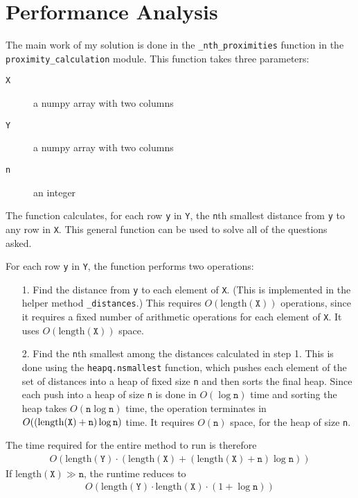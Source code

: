 \documentclass{amsart}
\theoremstyle{definition}
\theoremstyle{definition}
\begin{document}
\section{Performance Analysis}
The main work of my solution is done in the \texttt{\_nth\_proximities} function in the \texttt{proximity\_calculation} module.  This function takes three parameters:
\begin{description}
\item[\texttt{X}] a numpy array with two columns
\item[\texttt{Y}] a numpy array with two columns
\item[\texttt{n}] an integer
\end{description}
The function calculates, for each row \texttt{y} in \texttt{Y}, the \texttt{n}th smallest distance from \texttt{y} to any row in \texttt{X}.  This general function can be used to solve all of the questions asked.

For each row \texttt{y} in \texttt{Y}, the function performs two operations:
\begin{itemize}
\item[1.] Find the distance from \texttt{y} to each element of \texttt{X}.  (This is implemented in the helper method \texttt{\_distances}.)  This requires $O(\mbox{length}(\texttt{X}))$ operations, since it requires a fixed number of arithmetic operations for each element of \texttt{X}.  It uses $O(\mbox{length}(\texttt{X}))$ space.
\item[2.] Find the \texttt{n}th smallest among the distances calculated in step 1.  This is done using the \texttt{heapq.nsmallest} function, which pushes each element of the set of distances into a heap of fixed size \texttt{n} and then sorts the final heap.  Since each push into a heap of size \texttt{n} is done in $O(\log \texttt{n})$ time and sorting the heap takes $O(\texttt{n}\log \texttt{n})$ time, the operation terminates in $O((\mbox{length(\texttt{X})}+\texttt{n})\log \texttt{n})$ time.  It requires $O(\texttt{n})$ space, for the heap of size \texttt{n}.
\end{itemize}
The time required for the entire method to run is therefore
\begin{align*}
  O(\mbox{length}(\texttt{Y})\cdot (\mbox{length}(\texttt{X}) + (\mbox{length}(\texttt{X})+\texttt{n})\log \texttt{n}))
\end{align*}
If $\mbox{length}(\texttt{X}) \gg \texttt{n}$, the runtime reduces to
\begin{align}
  O(\mbox{length}(\texttt{Y})\cdot \mbox{length}(\texttt{X}) \cdot (1+\log \texttt{n}))\label{performance}
\end{align}
\end{document}
